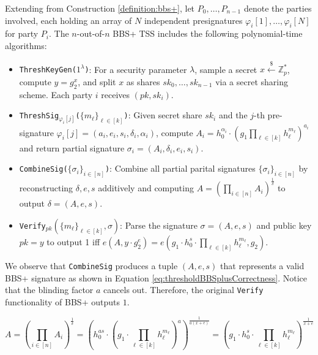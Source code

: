 \begin{construction}
Extending from Construction \ref{definition:bbs+}, let $P_0, \ldots, P_{n-1}$ denote the parties involved, each holding an array of $N$ independent presignatures $\varphi_{i}[1], \ldots, \varphi_{i}[N]$ for party $P_i$. The $n$-out-of-$n$ BBS+ TSS includes the following polynomial-time algorithms:
\begin{itemize}
    \item \texttt{\textup{ThreshKeyGen($1^\lambda$)}}: For a security parameter $\lambda$, sample a secret $x \stackrel{\$}{\leftarrow} \mathbb{Z}_p^*$, compute $y = g_2^x$, and split $x$ as shares ${sk_0, \ldots, sk_{n-1}}$ via a secret sharing scheme. Each party $i$ receives $(pk, sk_i)$.
    \item \texttt{\textup{ThreshSig$_{\varphi_{i}[j]}$($\{m_{\ell}\}_{\ell \in [k]}$)}}: Given secret share $sk_i$ and the \(j\)-th pre-signature $\varphi_{i}[j] = (a_i,e_i,s_i,\delta_i,\alpha_i)$, compute $A_i = h_0^{\alpha_i} \cdot \left( g_1\prod_{\ell \in [k]} h_{\ell}^{m_{\ell}} \right)^{a_i}$ and return partial signature $\sigma_i = (A_i, \delta_i, e_i, s_i)$.
    
    \item \texttt{\textup{CombineSig($\{\sigma_{i}\}_{i \in [n]}$)}}: Combine all partial parital signatures $\{\sigma_{i}\}_{i \in [n]}$ by reconstructing $\delta, e, s$ additively and computing $A = (\prod_{i \in [n]} A_i)^{\frac{1}{\delta}}$ to output $\delta = (A, e, s)$.
    
    \item \texttt{\textup{Verify}}$_{pk}$$(\{m_{\ell}\}_{\ell \in [k]}, \sigma)$: Parse the signature $\sigma = (A, e, s)$ and public key $pk = y$ to output 1 iff $e(A, y \cdot g_2^e) = e(g_1\cdot h_0^s \cdot \prod_{\ell \in [k]} h_{\ell}^{m_{\ell}}, g_2)$.
\end{itemize}
\end{construction}

We observe that \texttt{\textup{CombineSig}} produces a tuple $(A, e, s)$ that represents a valid BBS+ signature as shown in Equation \ref{eq:thresholdBBSplusCorrectness}. Notice that the blinding factor $a$ cancels out. Therefore, the original \texttt{\textup{Verify}} functionality of BBS+ outputs $1$.

\begin{equation}
    A = (\prod_{i \in [n]} A_i)^{\frac{1}{\delta}} = \left( h_0^{as}\cdot (g_1\cdot \prod_{\ell \in [k]} h_{\ell}^{m_{\ell}})^a \right)^{\frac{1}{a(x+e)}} = \left( g_1\cdot h_0^{s}\cdot \prod_{\ell \in [k]} h_{\ell}^{m_{\ell}} \right)^{\frac{1}{x+e}}
\label{eq:thresholdBBSplusCorrectness}  
\end{equation}

